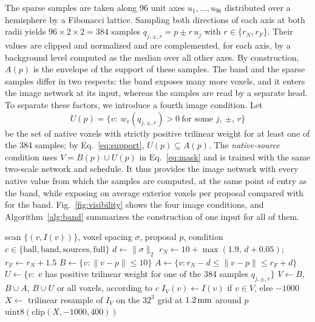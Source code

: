 The sparse samples are taken along 96 unit axes $u_1,\dots,u_{96}$ distributed over a hemisphere by a Fibonacci lattice. Sampling both directions of each axis at both radii yields $96\times2\times2=384$ samples $q_{j,\pm,r}=p\pm r\,u_j$ with $r\in\{r_N,r_F\}$. Their values are clipped and normalized and are complemented, for each axis, by a background level computed as the median over all other axes. By construction, $A(p)$ is the envelope of the support of these samples. The band and the sparse samples differ in two respects: the band exposes many more voxels, and it enters the image network at its input, whereas the samples are read by a separate head. To separate these factors, we introduce a fourth image condition. Let
\begin{equation}
U(p)=\big\{v:\ w_v(q_{j,\pm,r})>0\ \text{for some } j,\ \pm,\ r\big\}
\label{eq:sources}
\end{equation}
be the set of native voxels with strictly positive trilinear weight for at least one of the 384 samples; by Eq.~\eqref{eq:support}, $U(p)\subseteq A(p)$. The \emph{native-source} condition uses $V=B(p)\cup U(p)$ in Eq.~\eqref{eq:mask} and is trained with the same two-scale network and schedule. It thus provides the image network with every native value from which the samples are computed, at the same point of entry as the band, while exposing on average \QuerySources{} exterior voxels per proposal compared with \BandSources{} for the band. Fig.~\ref{fig:visibility} shows the four image conditions, and Algorithm~\ref{alg:band} summarizes the construction of one input for all of them.

\begin{algorithm}[t]
\caption{Construction of one visibility-controlled input.}
\label{alg:band}
\small
\begin{algorithmic}[1]
\Require scan $\{(v,I(v))\}$, voxel spacing $\sigma$, proposal $p$, condition $c\in\{\text{ball},\text{band},\text{sources},\text{full}\}$
\State $d\gets\lVert \sigma\rVert_2$ 
\State $r_N\gets 10+\max(1.9,\,d+0.05)$;\ \ $r_F\gets r_N+1.5$ 
\State $B\gets\{v:\lVert v-p\rVert\le10\}$
\State $A\gets\{v:r_N-d\le\lVert v-p\rVert\le r_F+d\}$ 
\State $U\gets\{v:\ v$ has positive trilinear weight for one of the 384 samples $q_{j,\pm,r}\}$
\State $V\gets B$, $B\cup A$, $B\cup U$ or all voxels, according to $c$
\State $I_V(v)\gets I(v)$ if $v\in V$, else $-1000$ 
\State $X\gets$ trilinear resample of $I_V$ on the $32^3$ grid at $1.2\,\mathrm{mm}$ around $p$
\State \Return $\mathrm{uint8}(\mathrm{clip}(X,-1000,400))$
\end{algorithmic}
\end{algorithm}

